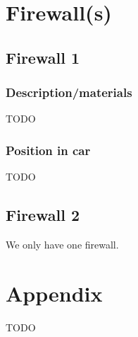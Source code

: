 \documentclass{article}
\begin{document}
\section{Firewall(s)}
\subsection{Firewall 1}
\subsubsection{Description/materials}
TODO

\subsubsection{Position in car}
TODO

\subsection{Firewall 2}
We only have one firewall. 

\section{Appendix}
TODO
\end{document}
